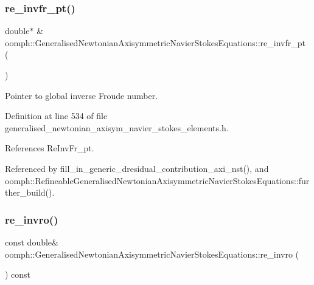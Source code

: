 \subsubsection{\texorpdfstring{re\+\_\+invfr\+\_\+pt()}{re\_invfr\_pt()}}
{\footnotesize\ttfamily double$\ast$ \& oomph\+::\+Generalised\+Newtonian\+Axisymmetric\+Navier\+Stokes\+Equations\+::re\+\_\+invfr\+\_\+pt (\begin{DoxyParamCaption}{ }\end{DoxyParamCaption})\hspace{0.3cm}{\ttfamily [inline]}}



Pointer to global inverse Froude number. 



Definition at line 534 of file generalised\+\_\+newtonian\+\_\+axisym\+\_\+navier\+\_\+stokes\+\_\+elements.\+h.



References Re\+Inv\+Fr\+\_\+pt.



Referenced by fill\+\_\+in\+\_\+generic\+\_\+dresidual\+\_\+contribution\+\_\+axi\+\_\+nst(), and oomph\+::\+Refineable\+Generalised\+Newtonian\+Axisymmetric\+Navier\+Stokes\+Equations\+::further\+\_\+build().

\mbox{\label{classoomph_1_1GeneralisedNewtonianAxisymmetricNavierStokesEquations_a126b1666893257f251499e07ebdf4866}} 
\subsubsection{\texorpdfstring{re\+\_\+invro()}{re\_invro()}}
{\footnotesize\ttfamily const double\& oomph\+::\+Generalised\+Newtonian\+Axisymmetric\+Navier\+Stokes\+Equations\+::re\+\_\+invro (\begin{DoxyParamCaption}{ }\end{DoxyParamCaption}) const\hspace{0.3cm}{\ttfamily [inline]}}



